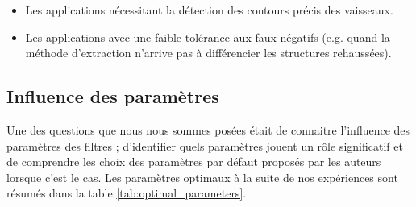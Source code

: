 \begin{itemize}
  \item Les applications nécessitant la détection des contours précis des vaisseaux.
  \item Les applications avec une faible tolérance aux faux négatifs (e.g. quand la méthode d'extraction n'arrive pas à différencier les structures rehaussées). 
\end{itemize}

\subsection{Influence des paramètres}

Une des questions que nous nous sommes posées était de connaitre l'influence des paramètres des filtres ; d'identifier quels paramètres jouent un rôle significatif et de comprendre les choix des paramètres par défaut proposés par les auteurs lorsque c'est le cas. Les paramètres optimaux à la suite de nos expériences sont résumés dans la table \ref{tab:optimal_parameters}.


